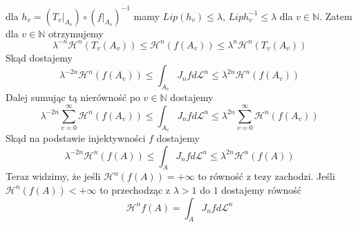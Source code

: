 \begin{tw}
	dla $h_v = (T_v|_{A_v}) \circ (f|_{A_v})^{-1}$ mamy $Lip(h_v) \leq \lambda$, $Lip h_v^{-1} \leq \lambda$ dla $v \in \mathbb{N}$. Zatem dla $v \in \mathbb{N}$ otrzymujemy $$
		\lambda^{-n} \mathcal{H}^n(T_v(A_v)) \leq \mathcal{H}^n(f(A_v)) \leq \lambda^n \mathcal{H}^n(T_v(A_v))
	$$
	Skąd dostajemy $$
		\lambda^{-2n}\mathcal{H}^n(f(A_v)) \leq \int_{A_v}J_nf d \mathcal{L}^n \leq \lambda^{2n} \mathcal{H}^n(f(A_v))
	$$
	Dalej sumując tą nierówność po $v \in \mathbb{N}$ dostajemy $$
		\lambda^{-2n} \sum_{v=0}^{\infty} \mathcal{H}^n(f(A_v)) \leq \int_{A_v}J_nf d \mathcal{L}^n \leq \lambda^{2n} \sum_{v=0}^{\infty} \mathcal{H}^n(f(A_v))
	$$
	Skąd na podstawie injektywności $f$ dostajemy $$
		\lambda^{-2n}\mathcal{H}^n(f(A)) \leq \int_{A}J_nf d \mathcal{L}^n \leq \lambda^{2n} \mathcal{H}^n(f(A))
	$$
	Teraz widzimy, że jeśli $\mathcal{H}^n(f(A)) = +\infty$ to równość z tezy zachodzi. Jeśli \newline 
	$\mathcal{H}^n(f(A)) < +\infty$ to przechodząc z $\lambda > 1$ do $1$ dostajemy równość $$
		\mathcal{H}^n{f(A)} = \int_A J_nf d\mathcal{L}^n
	$$
\end{tw}